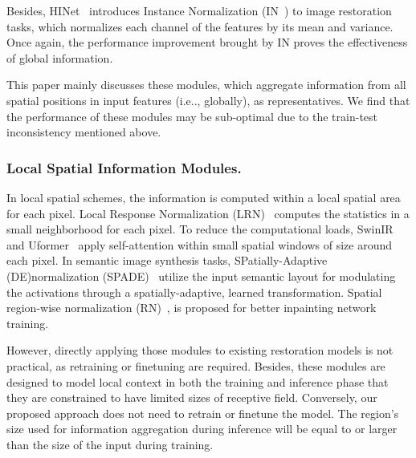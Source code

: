 \documentclass[runningheads]{llncs}
\makeatletter
\DeclareRobustCommand\onedot{\futurelet\@let@token\@onedot}
\def\@onedot{\ifx\@let@token.\else.\null\fi\xspace}
\def\ie{i.e\onedot}
\makeatother
\begin{document}
Besides, HINet~\cite{chen2021hinet} introduces Instance Normalization (IN~\cite{ulyanov2016instance}) to image restoration tasks, which normalizes each channel of the features by its mean and variance. Once again, the performance improvement brought by IN proves the effectiveness of global information. 

This paper mainly discusses these modules, which aggregate information from all spatial positions in input features (\ie, globally), as representatives.
We find that the performance of these modules may be sub-optimal due to the train-test inconsistency mentioned above.

\subsubsection{Local Spatial Information Modules.}
In local spatial schemes, the information is computed within a local spatial area for each pixel. 
Local Response Normalization (LRN)~\cite{lyu2008nonlinear,jarrett2009best,krizhevsky2012imagenet} computes the statistics in a small neighborhood for each pixel. To reduce the computational loads, SwinIR~\cite{liu2021swin} and Uformer~\cite{wang2021uformer} apply self-attention within small spatial windows of size  around each pixel.
In semantic image synthesis tasks, SPatially-Adaptive (DE)normalization (SPADE)~\cite{park2019semantic} utilize the input semantic layout for modulating the activations through a spatially-adaptive, learned transformation.
Spatial region-wise normalization (RN)~\cite{yu2020region}, is proposed for better inpainting network training. 
  
However, directly applying those modules to existing restoration models is not practical, as retraining or finetuning are required. Besides, these modules are designed to model local context in both the training and inference phase that they are constrained to have limited sizes of receptive field.
Conversely, our proposed approach does not need to retrain or finetune the model. The region's size used for information aggregation during inference will be equal to or larger than the size of the input during training. \newcommand{\FF}{\mathbf{F}}
\newcommand{\XX}{\mathbf{X}}
\newcommand{\KK}{\mathbf{K}}
\newcommand{\RR}{\mathbb{R}}
\newcommand{\UU}{\mathbf{U}}
\newcommand{\VV}{\mathbf{V}}
\newcommand{\WW}{\mathbf{W}}
\newcommand{\uu}{\mathbf{u}}
\newcommand{\vv}{\mathbf{v}}
\newcommand{\zz}{\mathbf{z}}
\newcommand{\xx}{\mathbf{x}}
\newcommand{\ThTh}{\boldsymbol{\theta}}
\end{document}
